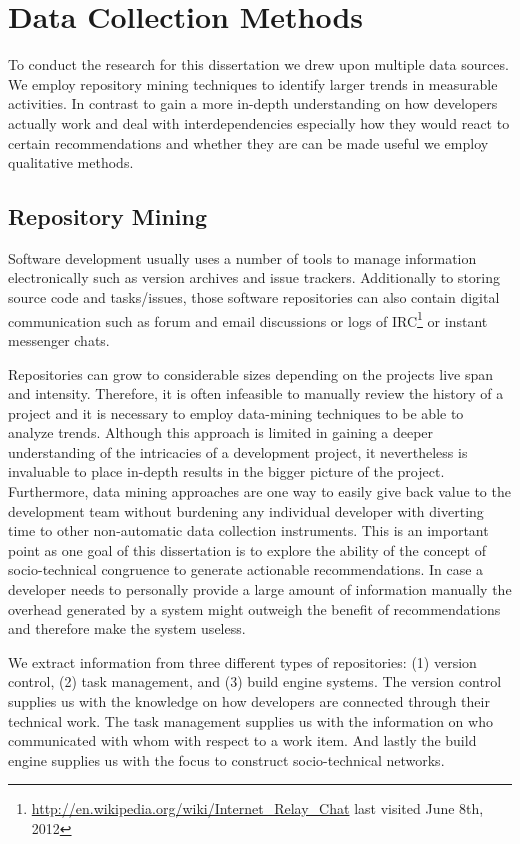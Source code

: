 \section{Data Collection Methods}
\label{c5:sec:datacollection}
To conduct the research for this dissertation we drew upon multiple data sources.
We employ repository mining techniques to identify larger trends in measurable activities.
In contrast to gain a more in-depth understanding on how developers actually work and deal with interdependencies especially how they would react to certain recommendations and whether they are can be made useful we employ qualitative methods.

\subsection{Repository Mining}
Software development usually uses a number of tools to manage information electronically such as version archives and issue trackers.
Additionally to storing source code and tasks/issues, those software repositories can also contain digital communication such as forum and email discussions or logs of IRC\footnote{\url{http://en.wikipedia.org/wiki/Internet_Relay_Chat} last visited June 8th, 2012} or instant messenger chats.

Repositories can grow to considerable sizes depending on the projects live span and intensity. 
Therefore, it is often infeasible to manually review the history of a project and it is necessary to employ data-mining techniques to be able to analyze trends.
Although this approach is limited in gaining a deeper understanding of the intricacies of a development project, it nevertheless is invaluable to place in-depth results in the bigger picture of the project.
Furthermore, data mining approaches are one way to easily give back value to the development team without burdening any individual developer with diverting time to other non-automatic data collection instruments.
This is an important point as one goal of this dissertation is to explore the ability of the concept of socio-technical congruence to generate actionable recommendations.
In case a developer needs to personally provide a large amount of information manually the overhead generated by a system might outweigh the benefit of recommendations and therefore make the system useless.

We extract information from three different types of repositories: (1) version control, (2) task management, and (3) build engine systems.
The version control supplies us with the knowledge on how developers are connected through their technical work.
The task management supplies us with the information on who communicated with whom with respect to a work item.
And lastly the build engine supplies us with the focus to construct socio-technical networks.

